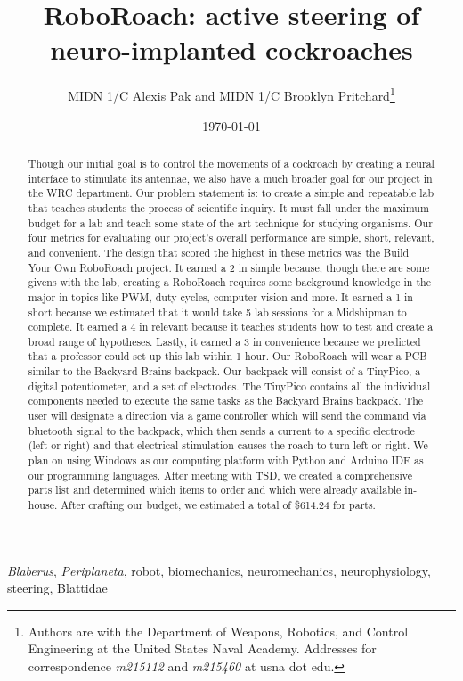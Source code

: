 \documentclass[twocolumn,10pt]{IEEEtran}
\title{RoboRoach: active steering of neuro-implanted cockroaches}
\author{MIDN 1/C Alexis Pak and MIDN 1/C Brooklyn Pritchard\thanks{Authors are with the Department of Weapons, Robotics, and Control Engineering at the United States Naval Academy. Addresses for correspondence \emph{m215112} and \emph{m215460} at usna dot edu.}}
\date{\today}
\newcommand{\Blaberus}{\emph{Blaberus}}
\newcommand{\Periplaneta}{\emph{Periplaneta}}
\begin{document}
\maketitlepage
\maketitle

\begin{abstract}
Though our initial goal is to control the movements of a cockroach by creating a neural interface to stimulate its antennae, we also have a much broader goal for our project in the WRC department. Our problem statement is: to create a simple and repeatable lab that teaches students the process of scientific inquiry. It must fall under the maximum budget for a lab and teach some state of the art technique for studying organisms. Our four metrics for evaluating our project’s overall performance are simple, short, relevant, and convenient. The design that scored the highest in these metrics was the Build Your Own RoboRoach project. It earned a 2 in simple because, though there are some givens with the lab, creating a RoboRoach requires some background knowledge in the major in topics like PWM, duty cycles, computer vision and more. It earned a 1 in short because we estimated that it would take 5 lab sessions for a Midshipman to complete. It earned a 4 in relevant because it teaches students how to test and create a broad range of hypotheses. Lastly, it earned a 3 in convenience because we predicted that a professor could set up this lab within 1 hour.  Our RoboRoach will wear a PCB similar to the Backyard Brains backpack. Our backpack will consist of a TinyPico, a digital potentiometer, and a set of electrodes. The TinyPico contains all the individual components needed to execute the same tasks as the Backyard Brains backpack. The user will designate a direction via a game controller which will send the command via bluetooth signal to the backpack, which then sends a current to a specific electrode (left or right) and that electrical stimulation causes the roach to turn left or right. We plan on using Windows as our computing platform with Python and Arduino IDE as our programming languages. After meeting with TSD, we created a comprehensive parts list and determined which items to order and which were already available in-house. After crafting our budget, we estimated a total of 
\$614.24 for parts. 
\end{abstract}

\begin{IEEEkeywords}
\Blaberus, \Periplaneta, robot, biomechanics, neuromechanics, neurophysiology, steering, Blattidae
\end{IEEEkeywords}
\end{document}
